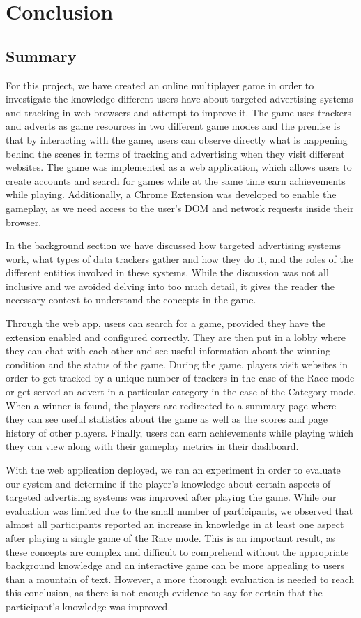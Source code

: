 \documentclass{l4proj}
\begin{document}
\chapter{Conclusion}    

\section{Summary}
For this project, we have created an online multiplayer game in order to investigate the knowledge different users have about targeted advertising systems and tracking in web browsers and attempt to improve it. The game uses trackers and adverts as game resources in two different game modes and the premise is that by interacting with the game, users can observe directly what is happening behind the scenes in terms of tracking and advertising when they visit different websites. The game was implemented as a web application, which allows users to create accounts and search for games while at the same time earn achievements while playing. Additionally, a Chrome Extension was developed to enable the gameplay, as we need access to the user's DOM and network requests inside their browser. 

In the background section we have discussed how targeted advertising systems work, what types of data trackers gather and how they do it, and the roles of the different entities involved in these systems. While the discussion was not all inclusive and we avoided delving into too much detail, it gives the reader the necessary context to understand the concepts in the game. 

Through the web app, users can search for a game, provided they have the extension enabled and configured correctly. They are then put in a lobby where they can chat with each other and see useful information about the winning condition and the status of the game. During the game, players visit websites in order to get tracked by a unique number of trackers in the case of the Race mode or get served an advert in a particular category in the case of the Category mode. When a winner is found, the players are redirected to a summary page where they can see useful statistics about the game as well as the scores and page history of other players. Finally, users can earn achievements while playing which they can view along with their gameplay metrics in their dashboard.

With the web application deployed, we ran an experiment in order to evaluate our system and determine if the player's knowledge about certain aspects of targeted advertising systems was improved after playing the game. While our evaluation was limited due to the small number of participants, we observed that almost all participants reported an increase in knowledge in at least one aspect after playing a single game of the Race mode. This is an important result, as these concepts are complex and difficult to comprehend without the appropriate background knowledge and an interactive game can be more appealing to users than a mountain of text. However, a more thorough evaluation is needed to reach this conclusion, as there is not enough evidence to say for certain that the participant's knowledge was improved. 
\end{document}
